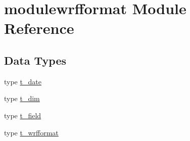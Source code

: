 \hypertarget{namespacemodulewrfformat}{}\section{modulewrfformat Module Reference}
\label{namespacemodulewrfformat}
\subsection*{Data Types}
\begin{DoxyCompactItemize}
\item 
type \mbox{\hyperlink{structmodulewrfformat_1_1t__date}{t\+\_\+date}}
\item 
type \mbox{\hyperlink{structmodulewrfformat_1_1t__dim}{t\+\_\+dim}}
\item 
type \mbox{\hyperlink{structmodulewrfformat_1_1t__field}{t\+\_\+field}}
\item 
type \mbox{\hyperlink{structmodulewrfformat_1_1t__wrfformat}{t\+\_\+wrfformat}}
\end{DoxyCompactItemize}
